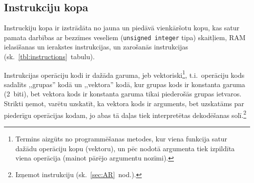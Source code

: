 \subsection{Instrukciju kopa} \label{sec:instrSet}

Instruckiju kopa ir izstrādāta no jauna un piedāvā vienkāršotu kopu, kas
satur pamata darbības ar bezzīmes veseliem (\texttt{unsigned integer} tipa)
skaitļiem, RAM ielasīšanas un ierakstes instrukcijas, un zarošanās
instrukcijas (sk.~\ref{tbl:instructions}~tabulu).

Instrukcijas operāciju kodi ir dažāda garuma, jeb vektoriski\footnote{%
	Termins aizgūts no programmēšanas metodes, kur viena funkcija
	satur dažādu operāciju kopu (vektoru), un pēc nodotā argumenta tiek
	izpildīta viena operācija (mainot pārējo argumentu nozīmi).},
t.i.~operāciju kods sadalīts ,,grupas'' kodā un ,,vektora'' kodā, kur
grupas kods ir konstanta garuma (2~biti), bet vektora kods ir konstanta
garuma tikai piederošās grupas ietvaros. Strikti ņemot, varētu uzskatīt, ka
vektora kods ir arguments, bet uzskatāms par piederīgu operācijas
kodam, jo abas tā daļas tiek interpretētas dekodēšanas solī.\footnote{%
	Izņemot  instrukciju (sk.~\ref{sec:AR}~nod.).}

